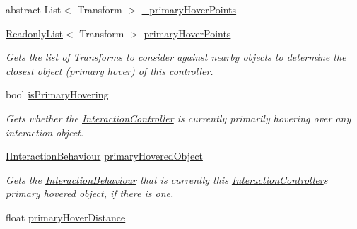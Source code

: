 \begin{DoxyCompactItemize}
abstract List$<$ Transform $>$ \mbox{\hyperlink{class_leap_1_1_unity_1_1_interaction_1_1_interaction_controller_a18c2955004efd717b06bc82eecae7698}{\+\_\+primary\+Hover\+Points}}
\item 
\mbox{\hyperlink{struct_leap_1_1_unity_1_1_readonly_list}{Readonly\+List}}$<$ Transform $>$ \mbox{\hyperlink{class_leap_1_1_unity_1_1_interaction_1_1_interaction_controller_a4ac00d9dac22e9a958b3bbff49fffdc1}{primary\+Hover\+Points}}
\begin{DoxyCompactList}\small\item\em Gets the list of Transforms to consider against nearby objects to determine the closest object (primary hover) of this controller. \end{DoxyCompactList}\item 
bool \mbox{\hyperlink{class_leap_1_1_unity_1_1_interaction_1_1_interaction_controller_ad4ef88d6265a7fce226b2f873237e45c}{is\+Primary\+Hovering}}
\begin{DoxyCompactList}\small\item\em Gets whether the \mbox{\hyperlink{class_leap_1_1_unity_1_1_interaction_1_1_interaction_controller}{Interaction\+Controller}} is currently primarily hovering over any interaction object. \end{DoxyCompactList}\item 
\mbox{\hyperlink{interface_leap_1_1_unity_1_1_interaction_1_1_i_interaction_behaviour}{I\+Interaction\+Behaviour}} \mbox{\hyperlink{class_leap_1_1_unity_1_1_interaction_1_1_interaction_controller_a56d551f3efcbfc06ecae0bb0d5e45f82}{primary\+Hovered\+Object}}
\begin{DoxyCompactList}\small\item\em Gets the \mbox{\hyperlink{class_leap_1_1_unity_1_1_interaction_1_1_interaction_behaviour}{Interaction\+Behaviour}} that is currently this \mbox{\hyperlink{class_leap_1_1_unity_1_1_interaction_1_1_interaction_controller}{Interaction\+Controller}}\textquotesingle{}s primary hovered object, if there is one. \end{DoxyCompactList}\item 
float \mbox{\hyperlink{class_leap_1_1_unity_1_1_interaction_1_1_interaction_controller_afeb62318cb32bef4787258c43412e0cf}{primary\+Hover\+Distance}}

\end{DoxyCompactItemize}
